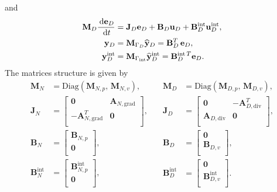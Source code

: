 \documentclass{ifacconf}
\begin{document}
and
\begin{equation}
\label{eq:fd_D}
\begin{aligned}
\mathbf{M}_D \frac{\,\mathrm{d} \mathbf{e}_D}{\,\mathrm{d} t} &= \mathbf{J}_D \mathbf{e}_D + \mathbf{B}_D \mathbf{u}_D + \mathbf{B}_{D}^{\text{int}} \mathbf{u}_D^{\text{int}}, \\
\mathbf{y}_D &= \mathbf{M}_{\Gamma_D} \widehat{\mathbf{y}}_D = \mathbf{B}_{D}^T \, \mathbf{e}_D, \\
\mathbf{y}_D^{\text{int}} &= \mathbf{M}_{\Gamma_{\text{int}}} \widehat{\mathbf{y}}_D^{\text{int}} = \mathbf{B}_{D}^{\text{int}\, T} \mathbf{e}_D. \\
\end{aligned}
\end{equation}
The matrices structure is given by
\begin{equation*}
\begin{aligned}
\mathbf{M}_N &= \mathrm{Diag}(\mathbf{M}_{N, p},\, \mathbf{M}_{N, v}), \\
\mathbf{J}_N &= \begin{bmatrix}
\mathbf{0} & \mathbf{A}_{N, \mathrm{grad}} \\
- \mathbf{A}_{N, \mathrm{grad}}^T & \mathbf{0} \\
\end{bmatrix}, \\
\mathbf{B}_N &= \begin{bmatrix}
\mathbf{B}_{N, p} \\
\mathbf{0} \\
\end{bmatrix}, \\
\mathbf{B}_{N}^{\text{int}} &= \begin{bmatrix}
\mathbf{B}_{N, p}^{\text{int}} \\
\mathbf{0} \\
\end{bmatrix},\\
\end{aligned} \quad 
\begin{aligned}
\mathbf{M}_D &= \mathrm{Diag}(\mathbf{M}_{D, p},\, \mathbf{M}_{D, v}), \\
\mathbf{J}_D &= \begin{bmatrix}
\mathbf{0} & -\mathbf{A}_{D, \mathrm{div}}^T \\
\mathbf{A}_{D, \mathrm{div}} & \mathbf{0} \\
\end{bmatrix}, \\
\mathbf{B}_D &= \begin{bmatrix}
\mathbf{0} \\
\mathbf{B}_{D, v} \\
\end{bmatrix}, \\
\mathbf{B}_{D}^{\text{int}} &= \begin{bmatrix}
\mathbf{0} \\
\mathbf{B}_{D, v}^{\text{int}} \\
\end{bmatrix}.\\
\end{aligned}
\end{equation*}
\end{document}

